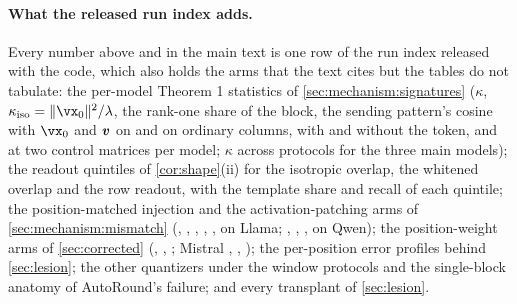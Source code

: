 \paragraph{What the released run index adds.}
Every number above and in the main text is one row of the run index released with the code, which also holds the arms that the text cites but the tables do not tabulate: the per-model Theorem 1 statistics of \cref{sec:mechanism:signatures} ($\kappa$, $\kappa_{\mathrm{iso}}=\|\vx_0\|^2/\lambda$, the rank-one share of the \bos{} block, the sending pattern's cosine with $\vx_0$ and $\boldsymbol{v}$ on \bos{} and on ordinary columns, with and without the \bos{} token, and at two control matrices per model; $\kappa$ across protocols for the three main models); the readout quintiles of \cref{cor:shape}(ii) for the isotropic overlap, the whitened overlap and the row readout, with the template share and recall of each quintile; the position-matched injection and the activation-patching arms of \cref{sec:mechanism:mismatch} (\PatchTpl{}, \PatchOrd{}, \PatchBos{}, \PatchAll{}, \PatchScaf{}, \PatchContent{} on Llama; \QPatchTpl{}, \QPatchOrd{}, \QPatchScaf{}, \QPatchContent{} on Qwen); the position-weight arms of \cref{sec:corrected} (\PosWtenIF{}, \PosWhundredIF{}, \CorrPosDropIF{}; Mistral \MposTenIF{}, \MposHundredIF{}, \McorrPosDropIF{}); the per-position error profiles behind \cref{sec:lesion}; the other quantizers under the window protocols and the single-block anatomy of AutoRound's failure; and every transplant of \cref{sec:lesion}.
